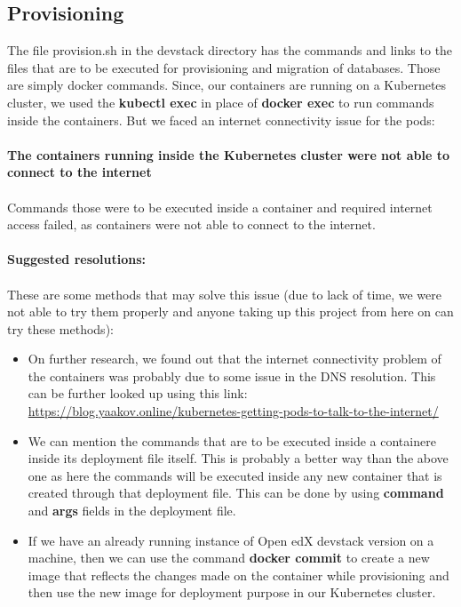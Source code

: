 \documentclass[12pt]{report}
\begin{document}
\subsection{Provisioning}
The file provision.sh in the devstack directory has the commands and links to the files that are to be executed for provisioning and migration of databases. Those are simply docker commands. Since, our containers are running on a Kubernetes cluster, we used the \textbf{kubectl exec} in place of \textbf{docker exec} to run commands inside the containers. But we faced an internet connectivity issue for the pods: \\\\
\textbf{The containers running inside the Kubernetes cluster were not able to connect to the internet}\\\\
Commands those were to be executed inside a container and required internet access failed, as containers were not able to connect to the internet.\\\\
\textbf{Suggested resolutions:\\\\}These are some methods that may solve this issue (due to lack of time, we were not able to try them properly and anyone taking up this project from here on can try these methods):
\begin{itemize}
	\item On further research, we found out that the internet connectivity problem of the containers was probably due to some issue in the DNS resolution. This can be further looked up using this link: \href{https://blog.yaakov.online/kubernetes-getting-pods-to-talk-to-the-internet/}{https://blog.yaakov.online/kubernetes-getting-pods-to-talk-to-the-internet/}\cite{DNS}
	\item We can mention the commands that are to be executed inside a containere inside its deployment file itself. This is probably a better way than the above one as here the commands will be executed inside any new container that is created through that deployment file. This can be done by using \textbf{command} and \textbf{args} fields in the deployment file.
	\item If we have an already running instance of Open edX devstack version on a machine, then we can use the command \textbf{docker commit} to create a new image that reflects the changes made on the container while provisioning and then use the new image for deployment purpose in our Kubernetes cluster.
\end{itemize}
\pagebreak
\end{document}
